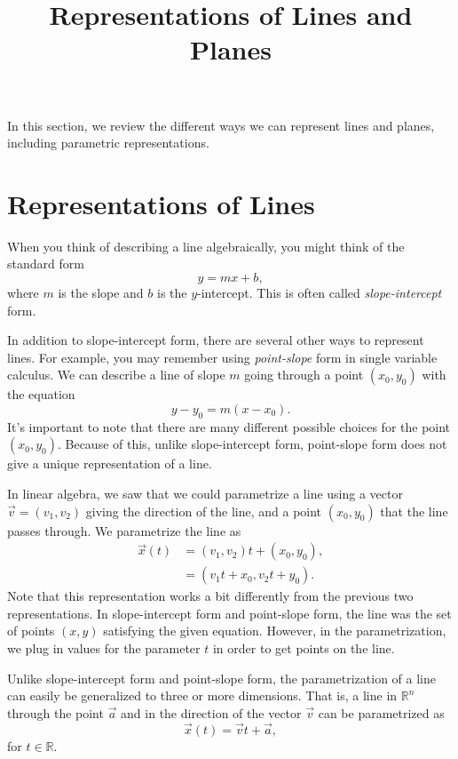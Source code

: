 \documentclass{ximera}
\title{Representations of Lines and Planes}
\begin{document}
  
\begin{abstract}  
\end{abstract}  
\maketitle 

In this section, we review the different ways we can represent lines and planes, including parametric representations.

\section{Representations of Lines}

When you think of describing a line algebraically, you might think of the standard form
\[
y = mx + b,
\]
where $m$ is the slope and $b$ is the $y$-intercept. This is often called \emph{slope-intercept} form.

 In addition to slope-intercept form, there are several other ways to represent lines. For example, you may remember using \emph{point-slope} form in single variable calculus. We can describe a line of slope $m$ going through a point $(x_0, y_0)$ with the equation
 \[
 y-y_0 = m(x-x_0).
 \]
 It's important to note that there are many different possible choices for the point $(x_0,y_0)$. Because of this, unlike slope-intercept form, point-slope form does not give a unique representation of a line.
 
 In linear algebra, we saw that we could parametrize a line using a vector $\vec{v}=(v_1,v_2)$ giving the direction of the line, and a point $(x_0, y_0)$ that the line passes through. We parametrize the line as
 \begin{align*}
 \vec{x}(t) &= (v_1,v_2)t+ (x_0, y_0),\\
 &= (v_1t+x_0, v_2t+y_0).
 \end{align*}
 Note that this representation works a bit differently from the previous two representations. In slope-intercept form and point-slope form, the line was the set of points $(x,y)$ satisfying the given equation. However, in the parametrization, we plug in values for the parameter $t$ in order to get points on the line.
 
 Unlike slope-intercept form and point-slope form, the parametrization of a line can easily be generalized to three or more dimensions. That is, a line in $\mathbb{R}^n$ through the point $\vec{a}$ and in the direction of the vector $\vec{v}$ can be parametrized as
 \[
 \vec{x}(t) = \vec{v}t + \vec{a},
 \]
 for $t\in\mathbb{R}$. 
 
\end{document}
